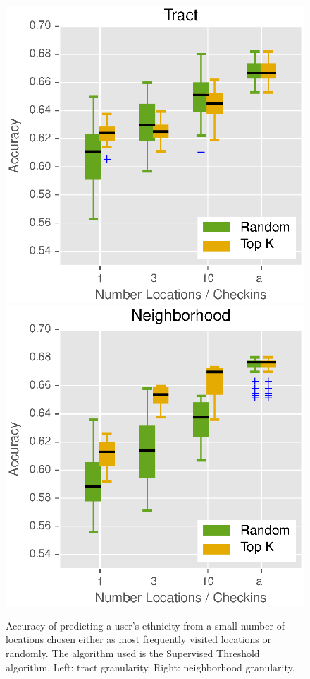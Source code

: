 \begin{figure}[t]
  \centering
  \includegraphics[width=0.49\linewidth]{fig/footprints/rand-to-accuracyTract.eps}
  \includegraphics[width=0.49\linewidth]{fig/footprints/rand-to-accuracyNeighborhood.eps}
  \caption{Accuracy of predicting a user's ethnicity from a small number of locations chosen either as most frequently visited locations or randomly. The algorithm used is the Supervised Threshold algorithm. Left: tract granularity. Right: neighborhood granularity.}
    \label{fig:howmuchdata2}
\end{figure}











